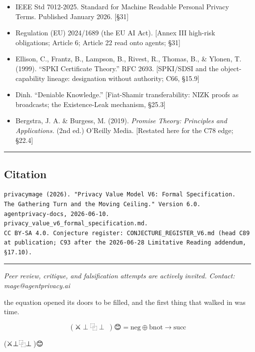 \documentclass[
]{article}
\begin{document}
\begin{itemize}
{  Quantitative Information Flow.} Springer. {[}The Bayes-capacity bound
  (the Miracle Theorem); §10.6{]}
\item
  IEEE Std 7012-2025. Standard for Machine Readable Personal Privacy
  Terms. Published January 2026. {[}§31{]}
\item
  Regulation (EU) 2024/1689 (the EU AI Act). {[}Annex III high-risk
  obligations; Article 6; Article 22 read onto agents; §31{]}
\item
  Ellison, C., Frantz, B., Lampson, B., Rivest, R., Thomas, B., \&
  Ylonen, T. (1999). ``SPKI Certificate Theory.'' RFC 2693. {[}SPKI/SDSI
  and the object-capability lineage: designation without authority; C66,
  §15.9{]}
\item
  Dinh. ``Deniable Knowledge.'' {[}Fiat-Shamir transferability: NIZK
  proofs as broadcasts; the Existence-Leak mechanism, §25.3{]}
\item
  Bergstra, J. A. \& Burgess, M. (2019). \emph{Promise Theory:
  Principles and Applications.} (2nd ed.) O'Reilly Media. {[}Restated
  here for the C78 edge; §22.4{]}
\end{itemize}

\begin{center}\rule{0.5\linewidth}{0.5pt}\end{center}

\subsection{Citation}\label{citation}

\begin{verbatim}
privacymage (2026). "Privacy Value Model V6: Formal Specification.
The Gathering Turn and the Moving Ceiling." Version 6.0.
agentprivacy-docs, 2026-06-10. privacy_value_v6_formal_specification.md.
CC BY-SA 4.0. Conjecture register: CONJECTURE_REGISTER_V6.md (head C89 at publication; C93 after the 2026-06-28 Limitative Reading addendum, §17.10).
\end{verbatim}

\begin{center}\rule{0.5\linewidth}{0.5pt}\end{center}

\emph{Peer review, critique, and falsification attempts are actively
invited. Contact: mage@agentprivacy.ai}

the equation opened its doors to be filled, and the first thing that
walked in was time.

\[(\text{⚔️} \perp \text{⿻} \perp \text{🧙})\text{😊} = \text{neg} \oplus \text{bnot} \to \text{succ}\]

(⚔️⊥⿻⊥🧙)😊
\end{document}
